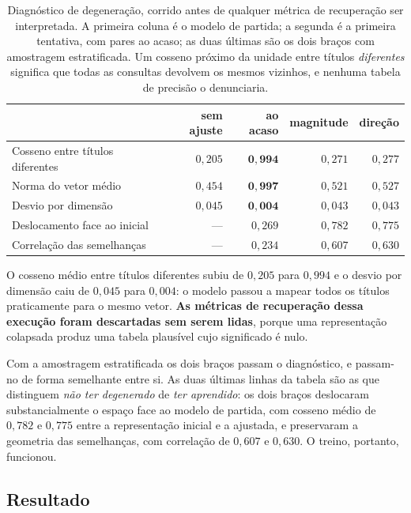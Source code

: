 \begin{table}[htbp]
\centering
\small
\caption[Diagnóstico de degeneração dos codificadores ajustados]{Diagnóstico de degeneração,
corrido antes de qualquer métrica de recuperação ser interpretada. A primeira coluna é o modelo
de partida; a segunda é a primeira tentativa, com pares ao acaso; as duas últimas são os dois
braços com amostragem estratificada. Um cosseno próximo da unidade entre títulos
\emph{diferentes} significa que todas as consultas devolvem os mesmos vizinhos, e nenhuma tabela
de precisão o denunciaria.}
\label{tab:av_qi4_colapso}
\begin{tabular}{lrrrr}
\toprule
 & sem ajuste & ao acaso & magnitude & direção \\
\midrule
Cosseno entre títulos diferentes & $0{,}205$ & $\mathbf{0{,}994}$ & $0{,}271$ & $0{,}277$ \\
Norma do vetor médio             & $0{,}454$ & $\mathbf{0{,}997}$ & $0{,}521$ & $0{,}527$ \\
Desvio por dimensão              & $0{,}045$ & $\mathbf{0{,}004}$ & $0{,}043$ & $0{,}043$ \\
Deslocamento face ao inicial     & ---       & $0{,}269$          & $0{,}782$ & $0{,}775$ \\
Correlação das semelhanças       & ---       & $0{,}234$          & $0{,}607$ & $0{,}630$ \\
\bottomrule
\end{tabular}
\end{table}

O cosseno médio entre títulos diferentes subiu de $0{,}205$ para $0{,}994$ e o desvio por
dimensão caiu de $0{,}045$ para $0{,}004$: o modelo passou a mapear todos os títulos
praticamente para o mesmo vetor. \textbf{As métricas de recuperação dessa execução foram
descartadas sem serem lidas}, porque uma representação colapsada produz uma tabela plausível cujo
significado é nulo.

Com a amostragem estratificada os dois braços passam o diagnóstico, e passam-no de forma
semelhante entre si. As duas últimas linhas da tabela são as que distinguem \emph{não ter
degenerado} de \emph{ter aprendido}: os dois braços deslocaram substancialmente o espaço face ao
modelo de partida, com cosseno médio de $0{,}782$ e $0{,}775$ entre a representação inicial e a
ajustada, e preservaram a geometria das semelhanças, com correlação de $0{,}607$ e $0{,}630$.
O treino, portanto, funcionou.

\subsection{Resultado}

